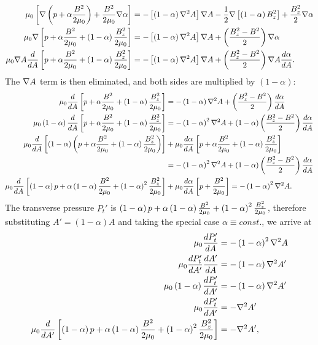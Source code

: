 \[\begin{split}
    \mu_0\left[ \nabla\left( p + \alpha\frac{B^2}{2\mu_0} \right) + \frac{B^2}{2\mu_0}\nabla\alpha \right]  &= -\left[ \left( 1-\alpha \right)\nabla^2 A \right] \nabla A - \frac{1}{2}\nabla\left[ \left( 1-\alpha \right)B_z^2 \right] + \frac{B_z^2}{2}\nabla\alpha \\
    \mu_0\nabla\left[ p + \alpha\frac{B^2}{2\mu_0} + \left( 1-\alpha \right)\frac{B_z^2}{2\mu_0} \right] &= -\left[ \left( 1-\alpha \right)\nabla^2 A \right]\nabla A + \left( \frac{B_z^2-B^2}{2} \right)\nabla\alpha \\
    \mu_0\nabla A\frac{d}{dA}\left[ p + \alpha\frac{B^2}{2\mu_0} + \left( 1-\alpha \right)\frac{B_z^2}{2\mu_0} \right] &= -\left[ \left( 1-\alpha \right)\nabla^2 A \right]\nabla A + \left( \frac{B_z^2-B^2}{2} \right)\nabla A \frac{d\alpha}{d A}. \\
\end{split}\]
The $\nabla A$ term is then eliminated, and both sides are multiplied by $(1-\alpha)$:
\[\begin{split}
    \mu_0\frac{d}{d A}\left[ p + \alpha\frac{B^2}{2\mu_0} + \left( 1-\alpha \right)\frac{B_z^2}{2\mu_0} \right] &= -\left( 1-\alpha \right)\nabla^2 A + \left( \frac{B_z^2-B^2}{2} \right)\frac{d\alpha}{dA} \\
    \mu_0\left( 1-\alpha \right)\frac{d}{d A}\left[ p + \alpha\frac{B^2}{2\mu_0} + \left( 1-\alpha \right)\frac{B_z^2}{2\mu_0} \right] &= -\left( 1-\alpha \right)^2\nabla^2 A + \left( 1-\alpha \right)\left( \frac{B_z^2-B^2}{2} \right)\frac{d\alpha}{dA} \\
    \mu_0\frac{d}{d A}\left[ \left( 1-\alpha \right)\left( p + \alpha\frac{B^2}{2\mu_0} + \left( 1-\alpha \right)\frac{B_z^2}{2\mu_0} \right) \right] &+ \mu_0\frac{d\alpha}{dA}\left[ p + \alpha\frac{B^2}{2\mu_0} + \left( 1-\alpha \right)\frac{B_z^2}{2\mu_0} \right] \\
    &= -\left( 1-\alpha \right)^2\nabla^2 A + \left( 1-\alpha \right)\left( \frac{B_z^2-B^2}{2} \right)\frac{d\alpha}{dA} \\
    \mu_0\frac{d}{d A}\left[ \left( 1-\alpha \right)p + \alpha\left( 1-\alpha \right)\frac{B^2}{2\mu_0} + \left( 1-\alpha \right)^2\frac{B_z^2}{2\mu_0} \right] &+ \mu_0\frac{d\alpha}{dA}\left[ p + \frac{B^2}{2\mu_0} \right] = -\left( 1-\alpha \right)^2\nabla^2 A. \\
\end{split}\]
The transverse pressure $P_t'$ is $\left( 1-\alpha \right)p + \alpha\left( 1-\alpha \right)\frac{B^2}{2\mu_0} + \left( 1-\alpha \right)^2\frac{B_z^2}{2\mu_0}$, therefore substituting $A'=(1-\alpha)A$ and taking the special case $\alpha\equiv const.$, we arrive at
\begin{equation}
    \begin{split}
        \mu_0\frac{dP_t'}{dA} &= -\left( 1-\alpha \right)^2\nabla^2 A \\
        \mu_0\frac{dP_t'}{dA'}\frac{dA'}{dA} &= -\left( 1-\alpha \right)\nabla^2 A' \\
        \mu_0\left( 1-\alpha \right)\frac{dP_t'}{dA'} &= -\left( 1-\alpha \right)\nabla^2 A' \\
        \mu_0\frac{dP_t'}{dA'} &= -\nabla^2 A' \\
        \mu_0\frac{d}{dA'}\left[ \left( 1-\alpha \right)p + \alpha\left( 1-\alpha \right)\frac{B^2}{2\mu_0} + \left( 1-\alpha \right)^2\frac{B_z^2}{2\mu_0} \right] &= -\nabla^2 A', \\
    \end{split}
    \label{eq:extended-deriv}
\end{equation}
